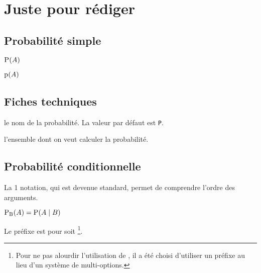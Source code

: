 \documentclass[12pt,a4paper]{article}
\begin{document}
\section{Juste pour rédiger}

\subsection{Probabilité \og simple \fg}

\newparaexample{}

\begin{latexex}
$\proba{A}$
\end{latexex}





\begin{latexex}
$\proba[p]{A}$
\end{latexex}




\subsection{Fiches techniques}


\IDoption{} le nom de la probabilité. La valeur par défaut est \verb#P#.

\IDarg{} l'ensemble dont on veut calculer la probabilité.




\subsection{Probabilité conditionnelle}


La 1\iere{} notation, qui est devenue standard, permet de comprendre l'ordre des arguments.
\begin{latexex}
 $\probacond {B}{A}
= \probacond*{B}{A}$
\end{latexex}





Le préfixe  est pour  soit 
\footnote{
	Pour ne pas alourdir l'utilisation de , il a été choisi d'utiliser un préfixe au lieu d'un système de multi-options.
}.
\end{document}
